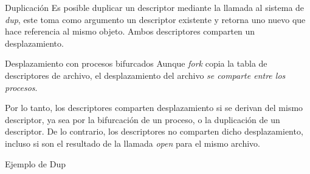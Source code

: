 \documentclass{libs/ufc_format}
\begin{document}
\begin{frame}{Duplicación}
  Es posible duplicar un descriptor mediante la llamada al sistema de \textit{\emph{dup}}, este toma como argumento un descriptor existente y retorna uno nuevo que hace referencia al mismo objeto. Ambos descriptores comparten un desplazamiento.
  \begin{block}{Desplazamiento con procesos bifurcados}
    Aunque \textit{fork} copia la tabla de descriptores de archivo, el desplazamiento del archivo \emph{se comparte entre los procesos}.
  \end{block}

  \vspace{0.4cm}

  Por lo tanto, los descriptores comparten desplazamiento si se derivan del mismo descriptor, ya sea por la bifurcación de un proceso, o la duplicación de un descriptor. De lo contrario, los descriptores no comparten dicho desplazamiento, incluso si son el resultado de la llamada \textit{open} para el mismo archivo.
\end{frame}
\begin{frame}{Ejemplo de Dup}
  
\end{frame}
\end{document}
